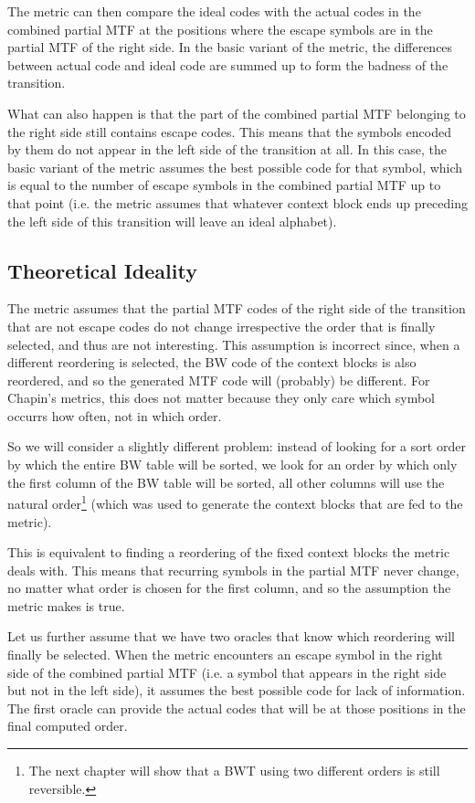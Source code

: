 \documentclass[a4paper]{scrreprt}
\begin{document}
The metric can then compare the ideal codes with the actual codes in the
combined partial MTF at the positions where the escape symbols are in the
partial MTF of the right side. In the basic variant of the metric, the
differences between actual code and ideal code are summed up to form the badness
of the transition.

What can also happen is that the part of the combined partial MTF belonging to
the right side still contains escape codes. This means that the symbols encoded
by them do not appear in the left side of the transition at all. In this case,
the basic variant of the metric assumes the best possible code for that symbol,
which is equal to the number of escape symbols in the combined partial MTF up to
that point (i.e. the metric assumes that whatever context block ends up
preceding the left side of this transition will leave an ideal alphabet).

\subsection{Theoretical Ideality}

The metric assumes that the partial MTF codes of the right side of the
transition that are not escape codes do not change irrespective the order that
is finally selected, and thus are not interesting. This assumption is incorrect
since, when a different reordering is selected, the BW code of the context
blocks is also reordered, and so the generated MTF code will (probably) be
different. For Chapin's metrics, this does not matter because they only care
which symbol occurrs how often, not in which order.

So we will consider a slightly different problem: instead of looking for a sort
order by which the entire BW table will be sorted, we look for an order by which
only the first column of the BW table will be sorted, all other columns will use
the natural order\footnote{The next chapter will show that a BWT using two
different orders is still reversible.} (which was used to generate the
context blocks that are fed to the metric).

This is equivalent to finding a reordering of the fixed context blocks the
metric deals with. This means that recurring symbols in the partial MTF never
change, no matter what order is chosen for the first column, and so the
assumption the metric makes is true.

Let us further assume that we have two oracles that know which reordering will
finally be selected. When the metric encounters an escape symbol in the right
side of the combined partial MTF (i.e. a symbol that appears in the right side
but not in the left side), it assumes the best possible code for lack of
information. The first oracle can provide the actual codes that will be at those
positions in the final computed order.
\end{document}
